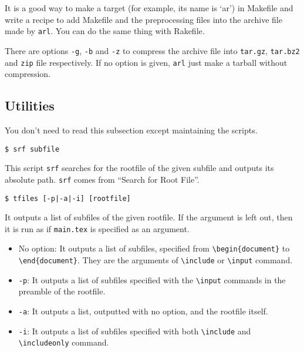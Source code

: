 It is a good way to make a target (for example, its name is `ar') in
Makefile and write a recipe to add Makefile and the preprocessing files
into the archive file made by \texttt{arl}. You can do the same thing
with Rakefile.

There are options \texttt{-g}, \texttt{-b} and \texttt{-z} to compress
the archive file into \texttt{tar.gz}, \texttt{tar.bz2} and \texttt{zip}
file respectively. If no option is given, \texttt{arl} just make a
tarball without compression.

\hypertarget{utilities}{%
\subsection{Utilities}\label{utilities}}

You don't need to read this subsection except maintaining the scripts.

\begin{verbatim}
$ srf subfile
\end{verbatim}

This script \texttt{srf} searches for the rootfile of the given subfile
and outputs its absolute path. \texttt{srf} comes from ``Search for Root
File''.

\begin{verbatim}
$ tfiles [-p|-a|-i] [rootfile]
\end{verbatim}

It outputs a list of subfiles of the given rootfile. If the argument is
left out, then it is run as if \texttt{main.tex} is specified as an
argument.

\begin{itemize}
\tightlist
\item
  No option: It outputs a list of subfiles, specified from
  \texttt{\textbackslash{}begin\{document\}} to
  \texttt{\textbackslash{}end\{document\}}. They are the arguments of
  \texttt{\textbackslash{}include} or \texttt{\textbackslash{}input}
  command.
\item
  \texttt{-p}: It outputs a list of subfiles specified with the
  \texttt{\textbackslash{}input} commands in the preamble of the
  rootfile.
\item
  \texttt{-a}: It outputs a list, outputted with no option, and the
  rootfile itself.
\item
  \texttt{-i}: It outputs a list of subfiles specified with both
  \texttt{\textbackslash{}include} and
  \texttt{\textbackslash{}includeonly} command.
\end{itemize}

